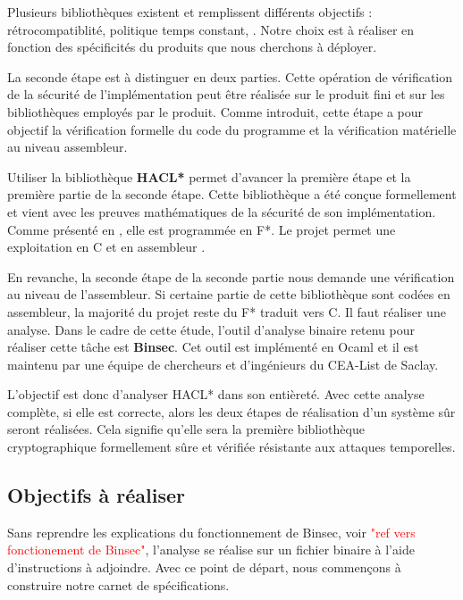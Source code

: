 Plusieurs bibliothèques existent \cite{OpenSSL, BearSSL, polubelova2020haclxn} et remplissent différents objectifs :  rétrocompatiblité, politique temps constant, \etc. Notre choix est à réaliser en fonction des spécificités du produits que nous cherchons à déployer.\medbreak

La seconde étape est à distinguer en deux parties. Cette opération de vérification de la sécurité de l'implémentation peut être réalisée sur le produit fini et sur les bibliothèques employés par le produit. Comme introduit, cette étape a pour objectif la vérification formelle du code du programme et la vérification matérielle au niveau assembleur.\medbreak

Utiliser la bibliothèque \textbf{HACL*} \cite{polubelova2020haclxn, HACL*} permet d'avancer la première étape et la première partie de la seconde étape. Cette bibliothèque a été conçue formellement et vient avec les preuves mathématiques de la sécurité de son implémentation. Comme présenté en , elle est programmée en F*. Le projet permet une exploitation en C et en assembleur \cite{HACL*}.\medbreak

En revanche, la seconde étape de la seconde partie nous demande une vérification au niveau de l'assembleur. Si certaine partie de cette bibliothèque sont codées en assembleur, la majorité du projet reste du F* traduit vers C. Il faut réaliser une analyse. Dans le cadre de cette étude, l'outil d'analyse binaire retenu pour réaliser cette tâche est \textbf{Binsec}. Cet outil est implémenté en Ocaml et il est maintenu par une équipe de chercheurs et d'ingénieurs du CEA-List de Saclay.\medbreak

L'objectif est donc d'analyser HACL* dans son entièreté. Avec cette analyse complète, si elle est correcte, alors les deux étapes de réalisation d'un système sûr seront réalisées. Cela signifie qu'elle sera la première bibliothèque cryptographique formellement sûre et vérifiée résistante aux attaques temporelles.

\subsection*{Objectifs à réaliser}

Sans reprendre les explications du fonctionnement de Binsec, voir \textcolor{red}{"ref vers fonctionement de Binsec"}, l'analyse se réalise sur un fichier binaire à l'aide d'instructions à adjoindre. Avec ce point de départ, nous commençons à construire notre carnet de spécifications.


